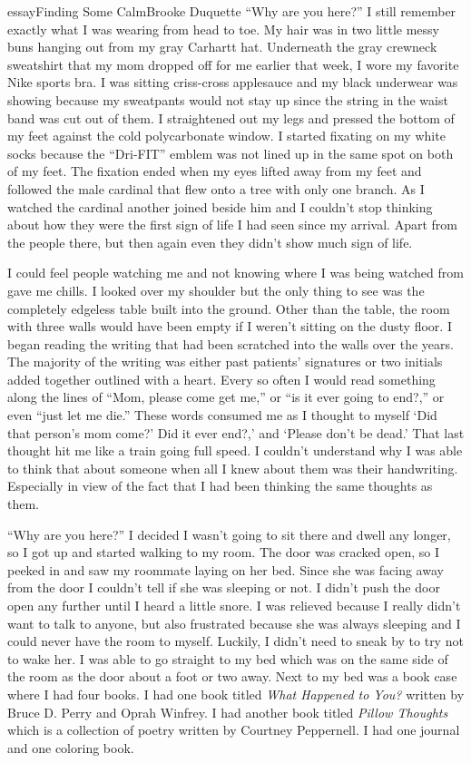 \begin{prose}{essay}{Finding Some Calm}{Brooke Duquette}
    “Why are you here?” I still remember exactly what I was wearing from head to toe. My hair was in two little messy buns hanging out from my gray Carhartt hat. Underneath the gray crewneck sweatshirt that my mom dropped off for me earlier that week, I wore my favorite Nike sports bra. I was sitting criss-cross applesauce and my black underwear was showing because my sweatpants would not stay up since the string in the waist band was cut out of them. I straightened out my legs and pressed the bottom of my feet against the cold polycarbonate window. I started fixating on my white socks because the “Dri-FIT” emblem was not lined up in the same spot on both of my feet. The fixation ended when my eyes lifted away from my feet and followed the male cardinal that flew onto a tree with only one branch. As I watched the cardinal another joined beside him and I couldn't stop thinking about how they were the first sign of life I had seen since my arrival. Apart from the people there, but then again even they didn't show much sign of life.\par
    I could feel people watching me and not knowing where I was being watched from gave me chills. I looked over my shoulder but the only thing to see was the completely edgeless table built into the ground. Other than the table, the room with three walls would have been empty if I weren't sitting on the dusty floor. I began reading the writing that had been scratched into the walls over the years. The majority of the writing was either past patients' signatures or two initials added together outlined with a heart. Every so often I would read something along the lines of “Mom, please come get me,” or “is it ever going to end?,” or even “just let me die.” These words consumed me as I thought to myself `Did that person's mom come?' Did it ever end?,' and `Please don't be dead.' That last thought hit me like a train going full speed. I couldn't understand why I was able to think that about someone when all I knew about them was their handwriting. Especially in view of the fact that I had been thinking the same thoughts as them.\par
    “Why are you here?” I decided I wasn't going to sit there and dwell any longer, so I got up and started walking to my room. The door was cracked open, so I peeked in and saw my roommate laying on her bed. Since she was facing away from the door I couldn't tell if she was sleeping or not. I didn't push the door open any further until I heard a little snore. I was relieved because I really didn't want to talk to anyone, but also frustrated because she was always sleeping and I could never have the room to myself. Luckily, I didn't need to sneak by to try not to wake her. I was able to go straight to my bed which was on the same side of the room as the door about a foot or two away. Next to my bed was a book case where I had four books. I had one book titled \textit{What Happened to You?} written by Bruce D. Perry and Oprah Winfrey. I had another book titled \textit{Pillow Thoughts} which is a collection of poetry written by Courtney Peppernell. I had one journal and one coloring book.\par

\end{prose}
